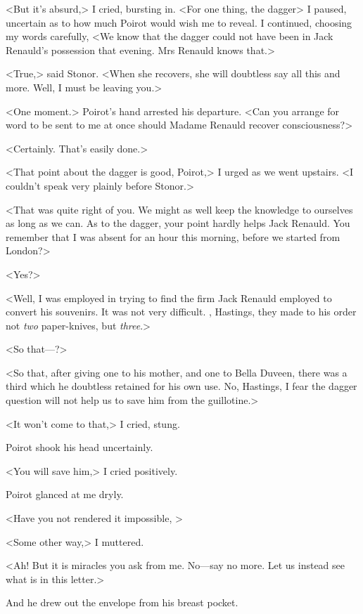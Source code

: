 <But it's absurd,> I cried, bursting in. <For one thing, the dagger\longdash> I paused, uncertain as to how much Poirot would wish me to reveal. I continued, choosing my words carefully, <We know that the dagger could not have been in Jack Renauld's possession that evening. Mrs Renauld knows that.> 

 <True,> said Stonor. <When she recovers, she will doubtless say all this and more. Well, I must be leaving you.> 

 <One moment.> Poirot's hand arrested his departure. <Can you arrange for word to be sent to me at once should Madame Renauld recover consciousness?> 

 <Certainly. That's easily done.> 

 <That point about the dagger is good, Poirot,> I urged as we went upstairs. <I couldn't speak very plainly before Stonor.> 

 <That was quite right of you. We might as well keep the knowledge to ourselves as long as we can. As to the dagger, your point hardly helps Jack Renauld. You remember that I was absent for an hour this morning, before we started from London?> 

 <Yes?> 

 <Well, I was employed in trying to find the firm Jack Renauld employed to convert his souvenirs. It was not very difficult. , Hastings, they made to his order not \emph{two} paper-knives, but \emph{three}.> 

 <So that—?> 

 <So that, after giving one to his mother, and one to Bella Duveen, there was a third which he doubtless retained for his own use. No, Hastings, I fear the dagger question will not help us to save him from the guillotine.> 

 <It won't come to that,> I cried, stung. 

 Poirot shook his head uncertainly. 

 <You will save him,> I cried positively. 

 Poirot glanced at me dryly. 

 <Have you not rendered it impossible, > 

 <Some other way,> I muttered. 

 <Ah!  But it is miracles you ask from me. No—say no more. Let us instead see what is in this letter.> 

 And he drew out the envelope from his breast pocket. 

